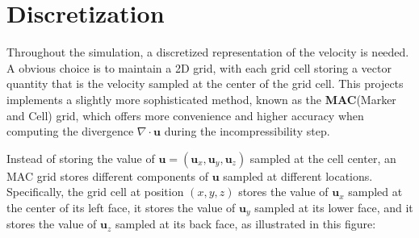 \section{Discretization}
Throughout the simulation, a discretized representation of the velocity is needed. A obvious choice is to maintain a 2D grid, with each grid cell storing a vector quantity that is the velocity sampled at the center of the grid cell. This projects implements a slightly more sophisticated method, known as the \textbf{MAC}(Marker and Cell) grid, which offers more convenience and higher accuracy when computing the divergence $\nabla \cdot \textbf{u}$ during the incompressibility step.

Instead of storing the value of $\textbf{u} = (\textbf{u}_x,\textbf{u}_y,\textbf{u}_z)$ sampled at the cell center, an MAC grid stores different components of $\textbf{u}$ sampled at different locations. Specifically, the grid cell at position $(x,y,z)$ stores the value of $\textbf{u}_x$ sampled at the center of its left face, it stores the value of $\textbf{u}_y$ sampled at its lower face, and it stores the value of $\textbf{u}_z$ sampled at its back face, as illustrated in this figure:

